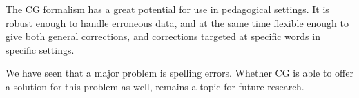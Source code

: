 \documentclass[11pt]{article}
\begin{document}
The CG formalism has a great potential for use in pedagogical settings.
It is robust enough to handle erroneous data, and at the same time flexible enough to give both general corrections, and corrections targeted at specific words in specific settings.

We have seen that a major problem is spelling errors. Whether CG is able to offer a solution for this problem as well, remains a topic for future research.




%
%
%
%
%




%
%



	
\end{document}
